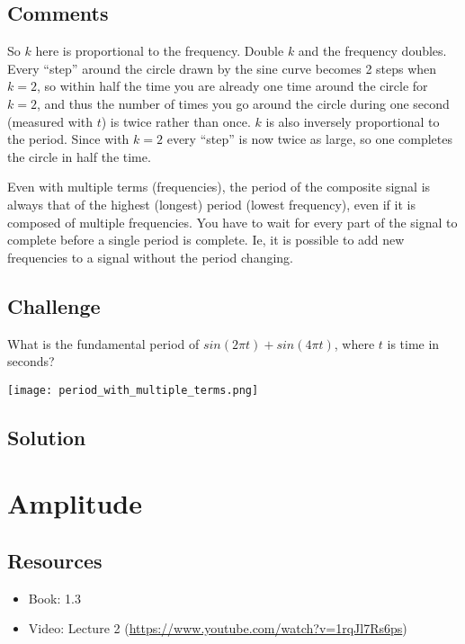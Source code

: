 \subsection*{Comments}
So $k$ here is proportional to the frequency. Double $k$ and the frequency doubles. Every ``step'' around the circle drawn by the sine curve becomes 2 steps when $k=2$, so within half the time you are already one time around the circle for $k=2$, and thus the number of times you go around the circle during one second (measured with $t$) is twice rather than once. $k$ is also inversely proportional to the period. Since with $k=2$ every ``step'' is now twice as large, so one completes the circle in half the time.

Even with multiple terms (frequencies), the period of the composite signal is always that of the highest (longest) period (lowest frequency), even if it is composed of multiple frequencies. You have to wait for every part of the signal to complete before a single period is complete. Ie, it is possible to add new frequencies to a signal without the period changing.

\subsection*{Challenge}
What is the fundamental period of $sin(2 \pi t) + sin(4 \pi t)$, where $t$ is time in seconds?

\texttt{[image: period\_with\_multiple\_terms.png]}

\subsection*{Solution}





\newpage
\section{Amplitude}

\subsection*{Resources}
\begin{itemize}
    \item Book: 1.3
    \item Video: Lecture 2 (\url{https://www.youtube.com/watch?v=1rqJl7Rs6ps})
\end{itemize}

